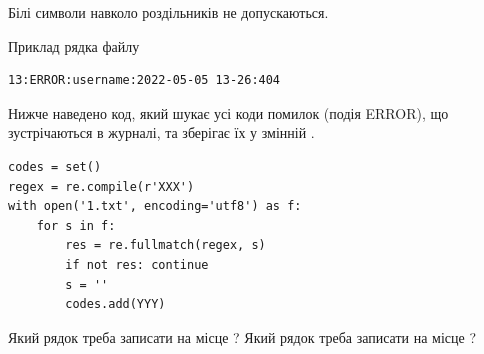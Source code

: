\documentclass[12pt, ukrainian]{article}
\begin{document}
{Білі символи навколо роздільників не допускаються.

Приклад рядка файлу



\begin{verbatim}
13:ERROR:username:2022-05-05 13-26:404
\end{verbatim}


Нижче наведено код, який шукає усі коди помилок (подія ERROR), що зустріча\-ють\-ся в журналі, та зберігає їх у змінній .



\begin{verbatim}
codes = set()
regex = re.compile(r'XXX')
with open('1.txt', encoding='utf8') as f:
    for s in f:
        res = re.fullmatch(regex, s)
        if not res: continue
        s = ''
        codes.add(YYY)
\end{verbatim}



Який рядок треба записати на місце  ?
Який рядок треба записати на місце  ?\par

}
\end{document}
